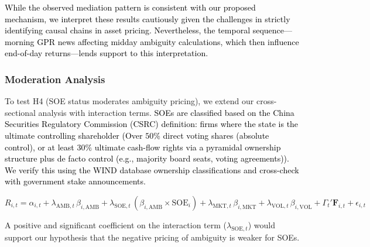\documentclass[preprint,12pt,authoryear]{elsarticle}
\begin{document}
\textcolor{black}{\textcolor{black}{While the observed mediation pattern is consistent with our proposed mechanism, we interpret these results cautiously given the challenges in strictly identifying causal chains in asset pricing. Nevertheless, the temporal sequence---morning GPR news affecting midday ambiguity calculations, which then influence end-of-day returns---lends support to this interpretation.}}

\subsubsection{Moderation Analysis}

To test H4 (SOE status moderates ambiguity pricing), we extend our cross-sectional analysis with interaction terms. \textcolor{black}{SOEs are classified based on the China Securities Regulatory Commission (CSRC) definition: firms where the state is the ultimate controlling shareholder (Over $50\%$ direct voting shares (absolute control), or at least $30\%$ ultimate cash-flow rights via a pyramidal ownership structure plus de facto control (e.g., majority board seats, voting agreements)). We verify this using the WIND database ownership classifications and cross-check with government stake announcements.}

\begin{equation}
R_{i,t} = \alpha_{i,t} + \lambda_{\text{AMB},t} \, \beta_{i,\text{AMB}} + \lambda_{\text{SOE},t} \, (\beta_{i,\text{AMB}} \times \text{SOE}_i) + \lambda_{\text{MKT},t} \, \beta_{i,\text{MKT}} + \lambda_{\text{VOL},t} \, \beta_{i,\text{VOL}} + \Gamma_{t}' \mathbf{F}_{i,t} + \epsilon_{i,t}
\end{equation}

A positive and significant coefficient on the interaction term ($\lambda_{\text{SOE},t}$) would support our hypothesis that the negative pricing of ambiguity is weaker for SOEs.
\end{document}
